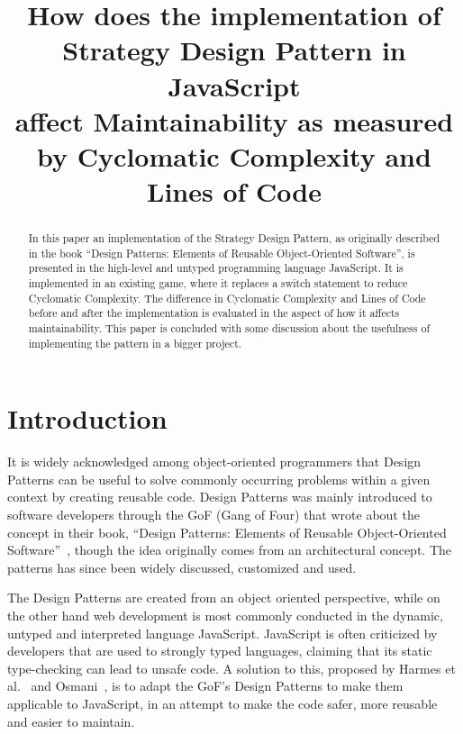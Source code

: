 \documentclass[conference, a4paper]{IEEEtran}
\begin{document}
\title{How does the implementation of\\
Strategy Design Pattern in JavaScript\\
affect Maintainability as measured by Cyclomatic Complexity and Lines of Code}
\author{
}

\maketitle

\begin{abstract}
	 In this paper an implementation of the Strategy Design Pattern, as originally described in the book ``Design Patterns: Elements of Reusable Object-Oriented Software'', is presented in the high-level and untyped programming language JavaScript. It is implemented in an existing game, where it replaces a switch statement to reduce Cyclomatic Complexity. The difference in Cyclomatic Complexity and Lines of Code before and after the implementation is evaluated in the aspect of how it affects maintainability. This paper is concluded with some discussion about the usefulness of implementing the pattern in a bigger project.
\end{abstract}

\section{Introduction}
\label{sec:Introduction}
It is widely acknowledged among object-oriented programmers that Design Patterns can be useful to solve commonly occurring problems within a given context  by creating reusable code. Design Patterns was mainly introduced to software developers through the GoF (Gang of Four) that wrote about the concept in their book, ``Design Patterns: Elements of Reusable Object-Oriented Software''~\cite{bibitem:GoF}, though the idea originally comes from an architectural concept. The patterns has since been widely discussed, customized and used.

The Design Patterns are created from an object oriented perspective, while on the other hand web development is most commonly conducted in the dynamic, untyped and interpreted language JavaScript. JavaScript is often criticized by developers that are used to strongly typed languages, claiming that its static type-checking can lead to unsafe code. A solution to this, proposed by Harmes et al.~\cite{bibitem:DiazHarmes} and Osmani~\cite{bibitem:Osmani}, is to adapt the GoF's Design Patterns to make them applicable to JavaScript, in an attempt to make the code safer, more reusable and easier to maintain.
\end{document}
